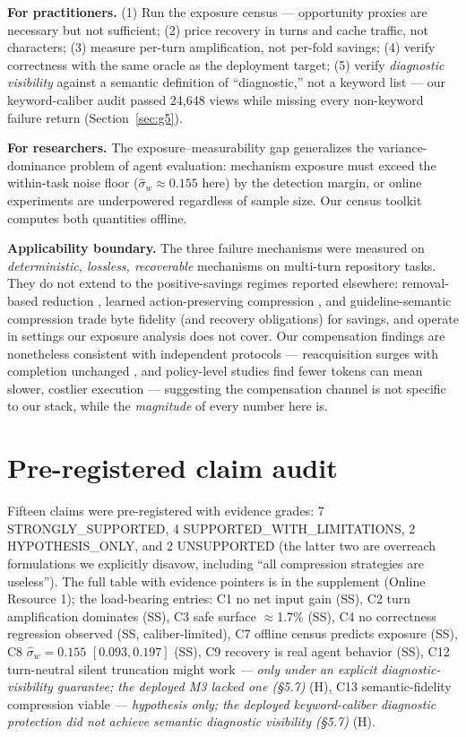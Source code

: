 \documentclass[twocolumn]{svjour3}       %
\begin{document}
\textbf{For practitioners.} (1) Run the exposure census --- opportunity proxies are
necessary but not sufficient; (2) price recovery in turns and cache traffic, not
characters; (3) measure per-turn amplification, not per-fold savings; (4) verify
correctness with the same oracle as the deployment target; (5) verify \emph{diagnostic
visibility} against a semantic definition of ``diagnostic,'' not a keyword list --- our
keyword-caliber audit passed 24{,}648 views while missing every non-keyword failure
return (Section~\ref{sec:g5}).

\textbf{For researchers.} The exposure--measurability gap generalizes the
variance-dominance problem of agent evaluation: mechanism exposure must exceed the
within-task noise floor ($\hat\sigma_w \approx 0.155$ here) by the detection margin, or
online experiments are underpowered regardless of sample size. Our census toolkit
computes both quantities offline.

\textbf{Applicability boundary.} The three failure mechanisms were measured on
\emph{deterministic, lossless, recoverable} mechanisms on multi-turn repository tasks.
They do not extend to the positive-savings regimes reported elsewhere: removal-based
reduction \cite{agentdiet2026}, learned action-preserving compression \cite{coact2026},
and guideline-semantic compression \cite{acon2026} trade byte fidelity (and recovery
obligations) for savings, and operate in settings our exposure analysis does not cover.
Our compensation findings are nonetheless consistent with independent protocols ---
reacquisition surges with completion unchanged \cite{compressioncost2026}, and
policy-level studies find fewer tokens can mean slower, costlier execution
\cite{beyondtokensavings2026} --- suggesting the compensation channel is not specific to
our stack, while the \emph{magnitude} of every number here is.

\section{Pre-registered claim audit}
\label{sec:claims}

Fifteen claims were pre-registered with evidence grades: 7 STRONGLY\_SUPPORTED, 4
SUPPORTED\_WITH\_LIMITATIONS, 2 HYPOTHESIS\_ONLY, and 2 UNSUPPORTED (the latter two are
overreach formulations we explicitly disavow, including ``all compression strategies are
useless''). The full table with evidence pointers is in the supplement (Online Resource
1); the load-bearing
entries: C1 no net input gain (SS), C2 turn amplification dominates (SS), C3 safe surface
$\approx$1.7\% (SS), C4 no correctness regression observed (SS, caliber-limited), C7
offline census predicts exposure (SS), C8 $\hat\sigma_w = 0.155$ $[0.093,0.197]$ (SS), C9
recovery is real agent behavior (SS), C12
turn-neutral silent truncation might work \emph{--- only under an explicit
diagnostic-visibility guarantee; the deployed M3 lacked one (\S5.7)} (H), C13
semantic-fidelity compression viable \emph{--- hypothesis only; the deployed
keyword-caliber diagnostic protection did not achieve semantic diagnostic visibility
(\S5.7)} (H).
\end{document}
